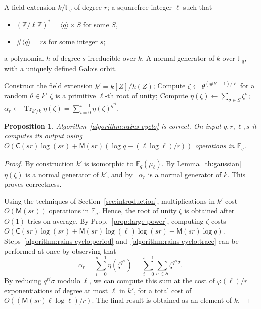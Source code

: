 \documentclass[12pt]{article}
\theoremstyle{plain}
\newtheorem{proposition}[theorem]{Proposition}
\theoremstyle{definition}
\DeclareMathOperator{\trace}{Tr} %
\def\Z{\ensuremath{\mathbb{Z}}}
\def\F{\ensuremath{\mathbb{F}}}
\def\MM{\ensuremath{\mathsf{M}}}
\def\CC{\ensuremath{\mathsf{C}}}
\def\euler{\ensuremath{\varphi}}
\newcounter{algorithm}
\begin{document}
\begin{algorithm}
  \label{algorithm:rains-cyclo}
  \begin{algorithmic}[1]
    \REQUIRE A field extension $k/\F_q$ of degree $r$; a squarefree
    integer $\ell$ such that
    \begin{itemize}
    \item $(\Z/\ell\Z)^\ast = \langle q\rangle \times S$ for some $S$,
    \item $\#\langle q\rangle = rs$ for some integer $s$;
    \end{itemize}
    a polynomial $h$ of degree $s$ irreducible over $k$.
    \ENSURE A normal generator of $k$ over $\F_q$,
    with a uniquely defined Galois orbit.
    
    \STATE Construct the field extension $k'=k[Z]/h(Z)$;
    \REPEAT
    \STATE Compute $\zeta\leftarrow \theta^{(\#k'-1)/\ell}$ for a random $\theta\in k'$
    \UNTIL $\zeta$ is a primitive $\ell$-th root of unity;
    \STATE\label{algorithm:rains-cyclo:period} Compute $\eta(\zeta) \leftarrow \sum_{\sigma\in S}\zeta^\sigma$;
    \RETURN\label{algorithm:rains-cyclo:trace} $\alpha_r \leftarrow \trace_{k'/k}\eta(\zeta) = \sum_{i=0}^{s-1}\eta(\zeta)^{q^{ri}}$.
  \end{algorithmic}
\end{algorithm}

\begin{proposition}
  Algorithm~\ref{algorithm:rains-cyclo} is correct. On input
  $q,r,\ell,s$ it computes its output using
  $O(\CC(sr)\log(sr) + \MM(sr)(\log q + (\ell\log\ell)/r))$ operations in $\F_q$.
\end{proposition}
\begin{proof}
  By construction $k'$ is isomorphic to $\F_q(\mu_\ell)$. By
  Lemma~\ref{th:gaussian} $\eta(\zeta)$ is a normal generator of $k'$,
  and by~\cite[Prop.~5.2.3.1]{mullen2013handbook} $\alpha_r$ is a
  normal generator of $k$. This proves correctness.

  Using the techniques of Section~\ref{sec:introduction},
  multiplications in $k'$ cost $O(\MM(sr))$ operations in $\F_q$.
  Hence, the root of unity $\zeta$ is obtained after $O(1)$ tries on
  average. By Prop.~\ref{prop:large-power}, computing $\zeta$
  costs $O(\CC(sr)\log(sr)+\MM(sr)\log(\ell)\log(sr)+\MM(sr)\log q)$.
  Steps~\ref{algorithm:rains-cyclo:period}
  and~\ref{algorithm:rains-cyclo:trace} can be performed at once by
  observing that
  \[\alpha_r = \sum_{i=0}^{s-1}\eta(\zeta^{q^{ri}})= \sum_{i=0}^{s-1}\sum_{\sigma\in S}\zeta^{q^{ri}\sigma}.\]
  By reducing $q^{ri}\sigma$ modulo $\ell$, we can compute this sum at
  the cost of $\euler(\ell)/r$ exponentiations of degree at most
  $\ell$ in $k'$, for a total cost of
  $O((\MM(sr)\ell\log\ell)/r)$. The final result is obtained as an
  element of $k$.
\end{proof}
\end{document}
